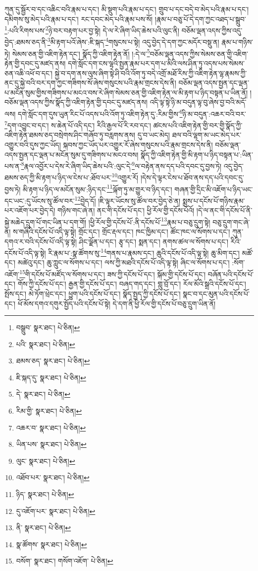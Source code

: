 ཀུན་དུ་སྦྱོར་བ་དང་འཆིང་བའི་རྣམ་པ་དང་། མི་སྡུག་པའི་རྣམ་པ་དང་། གྲུབ་པ་དང་བདེ་བ་མེད་པའི་རྣམ་པ་དང་། དམིགས་སུ་མེད་པའི་རྣམ་པ་དང་། རང་དབང་མེད་པའི་རྣམ་པས་སོ། །རྣམ་པ་བཅུ་པོ་དེ་དག་ཀྱང་འཐད་པ་སྒྲུབ་\footnote{བསྒྲུབ་  སྣར་ཐང་།  པེ་ཅིན། }:པའི་རིགས་པས་\footnote{པའི་  སྣར་ཐང་།  པེ་ཅིན། }ཉེ་བར་བརྟག་པར་བྱ་སྟེ། དེ་ལ་རེ་ཞིག་ཡིད་ཆེས་པའི་ལུང་ནི། བཅོམ་ལྡན་འདས་ཀྱིས་འདུ་བྱེད་:ཐམས་ཅད་ནི་\footnote{ཐམས་ཅད་  སྣར་ཐང་།  པེ་ཅིན། }མི་རྟག་པའོ་ཞེས་:ཇི་སྐད་\footnote{ཇི་སྐད་དུ་  སྣར་ཐང་།  པེ་ཅིན། }གསུངས་པ་སྟེ། འདུ་བྱེད་དེ་དག་ཀྱང་མདོར་བསྡུ་ན། རྣམ་པ་གཉིས་ཏེ། སེམས་ཅན་གྱི་འཇིག་རྟེན་དང་། སྣོད་ཀྱི་འཇིག་རྟེན་ནོ། །:དེ་ལ་\footnote{དེ་  སྣར་ཐང་།  པེ་ཅིན། }བཅོམ་ལྡན་འདས་ཀྱིས་སེམས་ཅན་གྱི་འཇིག་རྟེན་གྱི་དབང་དུ་མཛད་ནས། དགེ་སློང་དག་ངས་ལྷའི་སྤྱན་རྣམ་པར་དག་པ་མིའི་ལས་ཤིན་ཏུ་འདས་པས་སེམས་ཅན་འཆི་འཕོ་བ་དང་། སྐྱེ་བ་དག་ནས་ལུས་ཞིག་སྟེ་ཤི་བའི་འོག་ཏུ་བདེ་འགྲོ་མཐོ་རིས་ཀྱི་འཇིག་རྟེན་ལྷ་རྣམས་ཀྱི་ནང་དུ་སྐྱེ་བའི་བར་དག་ཀྱང་གཟིགས་སོ་ཞེས་གསུངས་པའི་རྣམ་གྲངས་དེས་ནི། བཅོམ་ལྡན་འདས་སྤྱན་དང་ལྡན་པ་མངོན་སུམ་གྱིས་གཟིགས་པ་མངའ་བས་རེ་ཞིག་སེམས་ཅན་གྱི་འཇིག་རྟེན་ལ་མི་རྟག་པ་ཉིད་བསྟན་པ་ཡིན་ནོ། །བཅོམ་ལྡན་འདས་ཀྱིས་སྣོད་ཀྱི་འཇིག་རྟེན་གྱི་དབང་དུ་མཛད་ནས། འདི་ལྟ་སྟེ་ཉི་མ་བདུན་ལྟ་བུ་ཞེས་བྱ་བའི་མདོ་ལས། དགེ་སློང་དག་དུས་ཡུན་རིང་པོ་འདས་པའི་འོག་ཏུ་འཇིག་རྟེན་དུ་:རིམ་གྱིས་\footnote{རིམ་གྱི་  སྣར་ཐང་།  པེ་ཅིན། }ཉི་མ་བདུན་:འཆར་བའི་བར་\footnote{འཆར་བ་  སྣར་ཐང་།  པེ་ཅིན། }དག་འབྱུང་བ་དང་། ས་ཆེན་པོ་འདི་དང་། རིའི་རྒྱལ་པོ་རི་རབ་དང་། ཚངས་པའི་འཇིག་རྟེན་གྱི་བར་གྱི་སྣོད་ཀྱི་འཇིག་རྟེན་ཐམས་ཅད་བསྲེགས་ཤིང་གཞོབ་ཏུ་བརླགས་ནས། དུ་བ་ཡང་མེད། ཐལ་བའི་ལྷག་མ་ཡང་མེད་པར་འགྱུར་བའི་དུས་ཀྱང་ཡོད། སྐབས་ཀྱང་ཡོད་པར་འགྱུར་རོ་ཞེས་གསུངས་པའི་རྣམ་གྲངས་དེས་ནི། བཅོམ་ལྡན་འདས་སྤྱན་དང་ལྡན་པ་མངོན་སུམ་དུ་གཟིགས་པ་མངའ་བས། སྣོད་ཀྱི་འཇིག་རྟེན་གྱི་མི་རྟག་པ་ཉིད་བསྟན་པ་:ཡིན་པས་ན་\footnote{ཡིན་པས་  སྣར་ཐང་།  པེ་ཅིན། }རྣལ་འབྱོར་པ་དེས་རེ་ཞིག་ཡིད་ཆེས་པའི་:ལུང་དེ་\footnote{ལུང་  སྣར་ཐང་།  པེ་ཅིན། }ལ་བརྟེན་ནས་དད་པའི་དབང་དུ་བྱས་ཏེ། འདུ་བྱེད་ཐམས་ཅད་ཀྱི་མི་རྟག་པ་ཉིད་ལ་ངེས་པ་:ཐོབ་པར་\footnote{འཐོབ་པར་  སྣར་ཐང་།  པེ་ཅིན། }འགྱུར་རོ། །དེས་དེ་ལྟར་ངེས་པ་ཐོབ་ནས་དད་པའི་དབང་དུ་བྱས་ཏེ། མི་རྟག་པ་ཉིད་ལ་མངོན་སུམ་:ཉིད་དང་\footnote{ཉིད་  སྣར་ཐང་།  པེ་ཅིན། }ལྐོག་ཏུ་མ་གྱུར་བ་ཉིད་དང་། གཞན་གྱི་དྲིང་མི་འཇོག་པ་ཉིད་ཡང་དང་ཡང་:དུ་ཡོངས་སུ་ཚོལ་བར་\footnote{དུ་འཇོག་པར་  སྣར་ཐང་།  པེ་ཅིན། }བྱེད་དོ། །ཇི་ལྟར་ཡོངས་སུ་ཚོལ་བར་བྱེད་ཅེ་ན། སྨྲས་པ་དངོས་པོ་གཉིས་རྣམ་པར་འཇོག་པར་བྱེད་དེ། གཉིས་གང་ཞེ་ན། ནང་གི་དངོས་པོ་དང་། ཕྱི་རོལ་གྱི་དངོས་པོའོ། །དེ་ལ་ནང་གི་དངོས་པོ་ནི་སྐྱེ་མཆེད་དྲུག་པོ་གང་ཡིན་པ་དག་གོ། །ཕྱི་རོལ་གྱི་དངོས་པོ་:ནི་དངོས་པོ་\footnote{ནི་  སྣར་ཐང་།  པེ་ཅིན། }རྣམ་པ་བཅུ་དྲུག་སྟེ། བཅུ་དྲུག་གང་ཞེ་ན། ས་གཞིའི་དངོས་པོ་འདི་ལྟ་སྟེ། གྲོང་དང་། གྲོང་རྡལ་དང་། ཁང་ཁྱིམ་དང་། ཚོང་ཁང་ལ་སོགས་པ་དང་། ཀུན་དགའ་ར་བའི་དངོས་པོ་འདི་ལྟ་སྟེ། ཤིང་ལྗོན་པ་དང་། རྩྭ་དང་། སྨན་དང་། ནགས་ཚལ་ལ་སོགས་པ་དང་། རིའི་དངོས་པོ་འདི་ལྟ་སྟེ། རི་རྣམ་པ་:སྣ་ཚོགས་སུ་\footnote{སྣ་ཚོགས་  སྣར་ཐང་།  པེ་ཅིན། }གནས་པ་རྣམས་དང་། ཆུའི་དངོས་པོ་འདི་ལྟ་སྟེ། ཆུ་མིག་དང་། མཚོ་དང་། མཚེའུ་དང་། ཆུ་ཀླུང་ལ་སོགས་པ་དང་། ལས་ཀྱི་མཐའི་དངོས་པོ་འདི་ལྟ་སྟེ། ཞིང་ལ་སོགས་པ་དང་། :སོག་འཇོག་\footnote{བསོག་  སྣར་ཐང་། གསོག་འཇོག་  པེ་ཅིན། }གི་དངོས་པོ་མཛོད་ལ་སོགས་པ་དང་། ཟས་ཀྱི་དངོས་པོ་དང་། སྐོམ་གྱི་དངོས་པོ་དང་། བཞོན་པའི་དངོས་པོ་དང་། གོས་ཀྱི་དངོས་པོ་དང་། རྒྱན་གྱི་དངོས་པོ་དང་། བཞད་གད་དང་། གླུ་བྲོ་དང་། རོལ་མོའི་སྒྲའི་དངོས་པོ་དང་། སྤོས་དང་། མེ་ཏོག་ཕྲེང་དང་། ཕྱུག་པའི་དངོས་པོ་དང་། སྣོད་སྤྱད་ཀྱི་དངོས་པོ་དང་། སྣང་བ་དང་མུན་པའི་དངོས་པོ་དང་། ཕོ་མོས་དགའ་དགུར་སྤྱོད་པའི་དངོས་པོ་སྟེ། དེ་དག་ནི་ཕྱི་རོལ་གྱི་དངོས་པོ་བཅུ་དྲུག་ཡིན་ནོ། 